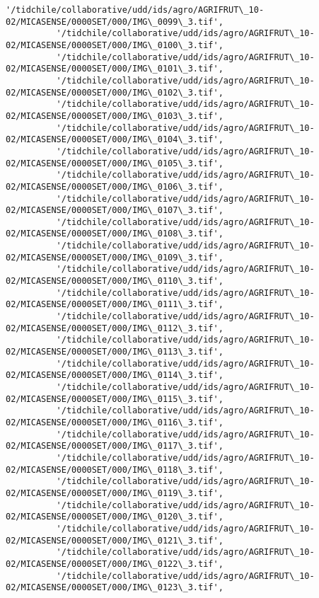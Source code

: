 \documentclass[11pt]{article}
\begin{document}
\begin{Verbatim}[commandchars=\\\{\}]
          '/tidchile/collaborative/udd/ids/agro/AGRIFRUT\_10-02/MICASENSE/0000SET/000/IMG\_0099\_3.tif',
          '/tidchile/collaborative/udd/ids/agro/AGRIFRUT\_10-02/MICASENSE/0000SET/000/IMG\_0100\_3.tif',
          '/tidchile/collaborative/udd/ids/agro/AGRIFRUT\_10-02/MICASENSE/0000SET/000/IMG\_0101\_3.tif',
          '/tidchile/collaborative/udd/ids/agro/AGRIFRUT\_10-02/MICASENSE/0000SET/000/IMG\_0102\_3.tif',
          '/tidchile/collaborative/udd/ids/agro/AGRIFRUT\_10-02/MICASENSE/0000SET/000/IMG\_0103\_3.tif',
          '/tidchile/collaborative/udd/ids/agro/AGRIFRUT\_10-02/MICASENSE/0000SET/000/IMG\_0104\_3.tif',
          '/tidchile/collaborative/udd/ids/agro/AGRIFRUT\_10-02/MICASENSE/0000SET/000/IMG\_0105\_3.tif',
          '/tidchile/collaborative/udd/ids/agro/AGRIFRUT\_10-02/MICASENSE/0000SET/000/IMG\_0106\_3.tif',
          '/tidchile/collaborative/udd/ids/agro/AGRIFRUT\_10-02/MICASENSE/0000SET/000/IMG\_0107\_3.tif',
          '/tidchile/collaborative/udd/ids/agro/AGRIFRUT\_10-02/MICASENSE/0000SET/000/IMG\_0108\_3.tif',
          '/tidchile/collaborative/udd/ids/agro/AGRIFRUT\_10-02/MICASENSE/0000SET/000/IMG\_0109\_3.tif',
          '/tidchile/collaborative/udd/ids/agro/AGRIFRUT\_10-02/MICASENSE/0000SET/000/IMG\_0110\_3.tif',
          '/tidchile/collaborative/udd/ids/agro/AGRIFRUT\_10-02/MICASENSE/0000SET/000/IMG\_0111\_3.tif',
          '/tidchile/collaborative/udd/ids/agro/AGRIFRUT\_10-02/MICASENSE/0000SET/000/IMG\_0112\_3.tif',
          '/tidchile/collaborative/udd/ids/agro/AGRIFRUT\_10-02/MICASENSE/0000SET/000/IMG\_0113\_3.tif',
          '/tidchile/collaborative/udd/ids/agro/AGRIFRUT\_10-02/MICASENSE/0000SET/000/IMG\_0114\_3.tif',
          '/tidchile/collaborative/udd/ids/agro/AGRIFRUT\_10-02/MICASENSE/0000SET/000/IMG\_0115\_3.tif',
          '/tidchile/collaborative/udd/ids/agro/AGRIFRUT\_10-02/MICASENSE/0000SET/000/IMG\_0116\_3.tif',
          '/tidchile/collaborative/udd/ids/agro/AGRIFRUT\_10-02/MICASENSE/0000SET/000/IMG\_0117\_3.tif',
          '/tidchile/collaborative/udd/ids/agro/AGRIFRUT\_10-02/MICASENSE/0000SET/000/IMG\_0118\_3.tif',
          '/tidchile/collaborative/udd/ids/agro/AGRIFRUT\_10-02/MICASENSE/0000SET/000/IMG\_0119\_3.tif',
          '/tidchile/collaborative/udd/ids/agro/AGRIFRUT\_10-02/MICASENSE/0000SET/000/IMG\_0120\_3.tif',
          '/tidchile/collaborative/udd/ids/agro/AGRIFRUT\_10-02/MICASENSE/0000SET/000/IMG\_0121\_3.tif',
          '/tidchile/collaborative/udd/ids/agro/AGRIFRUT\_10-02/MICASENSE/0000SET/000/IMG\_0122\_3.tif',
          '/tidchile/collaborative/udd/ids/agro/AGRIFRUT\_10-02/MICASENSE/0000SET/000/IMG\_0123\_3.tif',

\end{Verbatim}
\end{document}
